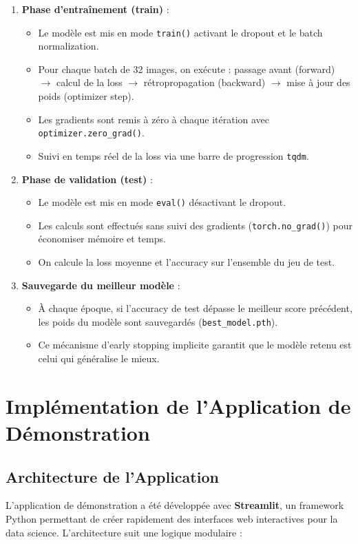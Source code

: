 \documentclass[12pt,a4paper]{report}
\begin{document}
\begin{enumerate}
    \item \textbf{Phase d'entraînement (train)} :
    \begin{itemize}
        \item Le modèle est mis en mode \texttt{train()} activant le dropout et le batch normalization.
        \item Pour chaque batch de 32 images, on exécute : passage avant (forward) $\rightarrow$ calcul de la loss $\rightarrow$ rétropropagation (backward) $\rightarrow$ mise à jour des poids (optimizer step).
        \item Les gradients sont remis à zéro à chaque itération avec \texttt{optimizer.zero\_grad()}.
        \item Suivi en temps réel de la loss via une barre de progression \texttt{tqdm}.
    \end{itemize}
    \item \textbf{Phase de validation (test)} :
    \begin{itemize}
        \item Le modèle est mis en mode \texttt{eval()} désactivant le dropout.
        \item Les calculs sont effectués sans suivi des gradients (\texttt{torch.no\_grad()}) pour économiser mémoire et temps.
        \item On calcule la loss moyenne et l'accuracy sur l'ensemble du jeu de test.
    \end{itemize}
    \item \textbf{Sauvegarde du meilleur modèle} :
    \begin{itemize}
        \item À chaque époque, si l'accuracy de test dépasse le meilleur score précédent, les poids du modèle sont sauvegardés (\texttt{best\_model.pth}).
        \item Ce mécanisme d'early stopping implicite garantit que le modèle retenu est celui qui généralise le mieux.
    \end{itemize}
\end{enumerate}

\section{Implémentation de l'Application de Démonstration}

\subsection{Architecture de l'Application}
L'application de démonstration a été développée avec \textbf{Streamlit}, un framework Python permettant de créer rapidement des interfaces web interactives pour la data science. L'architecture suit une logique modulaire :
\end{document}

